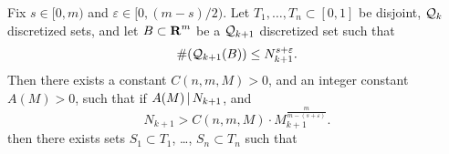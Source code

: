 \begin{theorem} \label{theorem059891891829}
    Fix $s \in [0,m)$ and $\varepsilon \in [0, (m-s)/2)$. Let $T_1, \dots, T_n \subset [0,1]$ be disjoint, $\operatorname{\mathcal{Q}}_k$ discretized sets, and let $B \subset \operatorname{\mathbf{R}}^m$ be a $\operatorname{\mathcal{Q}}_{k+1}$ discretized set such that
    \begin{equation} \label{equation6091904232093}
        \#(\operatorname{\mathcal{Q}}_{k+1}(B)) \leq N_{k+1}^{s + \varepsilon}.
    \end{equation}
    Then there exists a constant $C(n,m,M) > 0$, and an integer constant $A(M) > 0$, such that if $A(M) \operatorname{\mid} N_{k+1}$, and 
    \begin{equation} \label{equation19024u1298352389}
        N_{k+1} > C(n,m,M) \cdot M_{k+1}^{\frac{m}{m - (s + \varepsilon)}}.
    \end{equation}
    then there exists sets $S_1 \subset T_1$, \dots, $S_n \subset T_n$ such that

\end{theorem}
